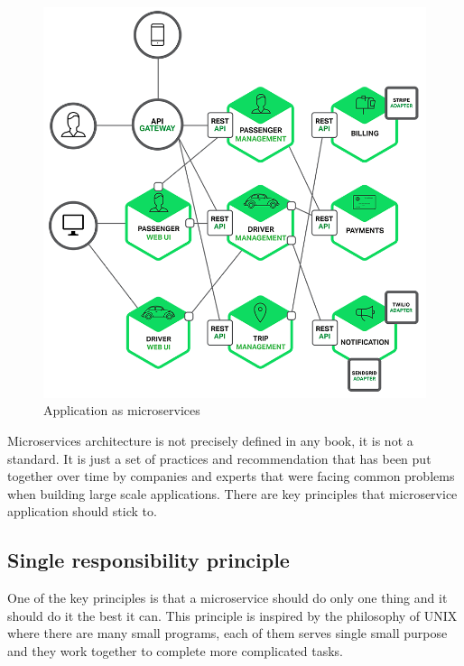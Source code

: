 \documentclass[12pt,oneside]{fithesis2}
\begin{document}
\begin{figure}[ht!]
	\label{microservice_application}
	\centering
	\includegraphics[width=\textwidth]{images/microservice_application2.png}
	\caption{Application as microservices\footnotemark}
\end{figure}


Microservices architecture is not precisely defined in any book, it is not a standard. It is just a set of practices and recommendation that has been put together over time by companies and experts that were facing common problems when building large scale applications. There are key principles that microservice application should stick to.

\subsection{Single responsibility principle}

One of the key principles is that a microservice should do only one thing and it should do it the best it can. This principle is inspired by the philosophy of UNIX where there are many small programs, each of them serves single small purpose and they work together to complete more complicated tasks.
\end{document}
